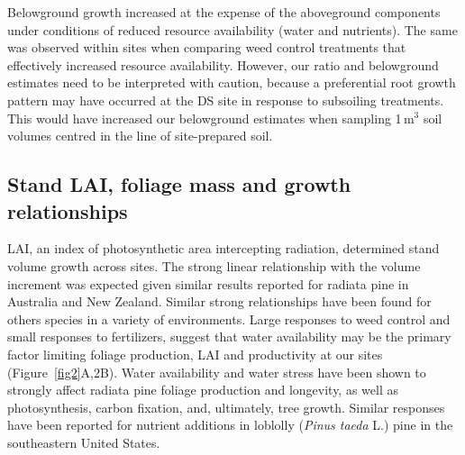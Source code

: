 \documentclass[final]{foresj}
\begin{document}
Belowground growth increased at the expense of the
aboveground components under conditions of reduced resource
availability (water and nutrients). The same was observed
within sites when comparing weed control treatments that
effectively increased resource availability. However, our
ratio and belowground estimates need to be interpreted with
caution, because a preferential root growth pattern may
have occurred at the DS site in response to subsoiling
treatments. This would have increased our belowground
estimates when sampling 1\,m$^{3}$ soil volumes centred in
the line of site-prepared soil.

\subsection{Stand LAI, foliage mass and growth
relationships}

LAI, an index of photosynthetic area intercepting
radiation,\cite{76} determined stand volume growth across
sites. The strong linear relationship with the volume
increment was expected given similar results reported for
radiata pine in Australia and New Zealand.\cite{7,8,46}
Similar strong relationships have been found for others
species in a variety of environments.\cite{1,2,7} Large
responses to weed control and small responses to
fertilizers, suggest that water availability may be the
primary factor limiting foliage production, LAI and
productivity at our sites (Figure~\ref{fig2}A,2B). Water
availability and water stress have been shown to strongly
affect radiata pine foliage production and longevity, as
well as photosynthesis, carbon fixation, and, ultimately,
tree growth.\cite{35,77} Similar responses have been
reported for nutrient additions in loblolly (\textit{Pinus
taeda} L.) pine in the southeastern United States.\cite{4,78,79}
\end{document}
